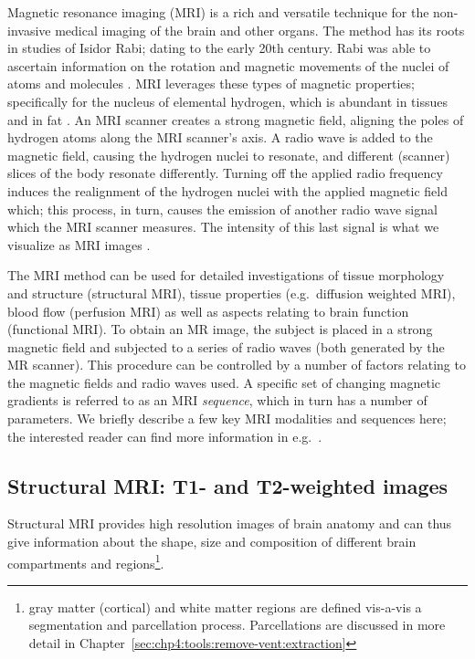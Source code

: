 Magnetic resonance imaging (MRI) is a rich and versatile technique for
the non-invasive medical imaging of the brain and other organs.  The method has 
its roots in studies of Isidor Rabi; dating to the early 20th century.  Rabi 
was able to ascertain information on the rotation and magnetic movements of 
the nuclei of atoms and molecules \cite{thomas2013}.  MRI leverages these types 
of magnetic properties; specifically for the nucleus of elemental hydrogen, 
which is abundant in tissues and in fat \cite{berger2002}.  An MRI scanner 
creates a strong magnetic field, aligning the poles of hydrogen atoms along the 
MRI scanner's axis.  A radio wave is added to the magnetic field, causing the 
hydrogen nuclei to resonate, and different (scanner) slices of the body resonate 
differently.  Turning off the applied radio frequency induces the realignment 
of the hydrogen nuclei with the applied magnetic field which; this process, in 
turn, causes the emission of another radio wave signal which the MRI scanner 
measures.  The intensity of this last signal is what we visualize as MRI 
images \cite{berger2002}.    


The MRI method can be used for detailed investigations of tissue morphology and
structure (structural MRI), tissue properties (e.g.~diffusion weighted MRI),
blood flow (perfusion MRI) as well as aspects relating to brain
function (functional MRI). To obtain an MR image, the subject is
placed in a strong magnetic field and subjected to a series of radio
waves (both generated by the MR scanner). This procedure can be
controlled by a number of factors relating to the magnetic fields and
radio waves used. A specific set of changing magnetic gradients is
referred to as an MRI \emph{sequence}, which in turn has a number of
parameters. We briefly describe a few key MRI modalities and sequences
here; the interested reader can find more information in
e.g.~\cite{haacke1999magnetic, payne2017cerebral, alexander2007diffusion}.

\subsection{Structural MRI: T1- and T2-weighted images}
\label{sec:T1T2}

Structural MRI provides high resolution images of brain anatomy and
can thus give information about the shape, size and composition of
different brain compartments and regions\footnote{gray matter (cortical) and 
white matter regions are defined vis-a-vis a segmentation and 
parcellation process.  Parcellations are discussed in more detail in 
Chapter~\ref{sec:chp4:tools:remove-vent:extraction}}. 

